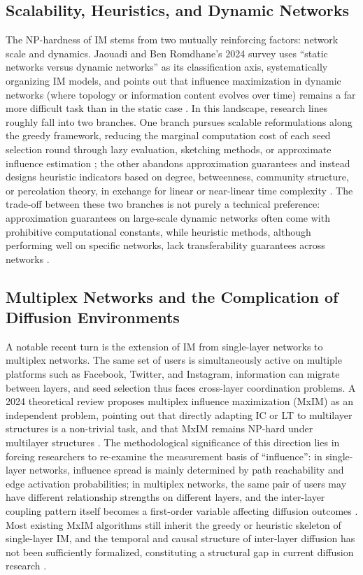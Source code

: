 \documentclass[12pt,a4paper]{article}
\begin{document}
\subsection{Scalability, Heuristics, and Dynamic Networks}

The NP-hardness of IM stems from two mutually reinforcing factors: network scale and dynamics. Jaouadi and Ben Romdhane's 2024 survey uses ``static networks versus dynamic networks'' as its classification axis, systematically organizing IM models, and points out that influence maximization in dynamic networks (where topology or information content evolves over time) remains a far more difficult task than in the static case \cite{ref7}. In this landscape, research lines roughly fall into two branches. One branch pursues scalable reformulations along the greedy framework, reducing the marginal computation cost of each seed selection round through lazy evaluation, sketching methods, or approximate influence estimation \cite{ref7}; the other abandons approximation guarantees and instead designs heuristic indicators based on degree, betweenness, community structure, or percolation theory, in exchange for linear or near-linear time complexity \cite{ref7}. The trade-off between these two branches is not purely a technical preference: approximation guarantees on large-scale dynamic networks often come with prohibitive computational constants, while heuristic methods, although performing well on specific networks, lack transferability guarantees across networks \cite{ref7}.

\subsection{Multiplex Networks and the Complication of Diffusion Environments}

A notable recent turn is the extension of IM from single-layer networks to multiplex networks. The same set of users is simultaneously active on multiple platforms such as Facebook, Twitter, and Instagram, information can migrate between layers, and seed selection thus faces cross-layer coordination problems. A 2024 theoretical review proposes multiplex influence maximization (MxIM) as an independent problem, pointing out that directly adapting IC or LT to multilayer structures is a non-trivial task, and that MxIM remains NP-hard under multilayer structures \cite{ref8}. The methodological significance of this direction lies in forcing researchers to re-examine the measurement basis of ``influence'': in single-layer networks, influence spread is mainly determined by path reachability and edge activation probabilities; in multiplex networks, the same pair of users may have different relationship strengths on different layers, and the inter-layer coupling pattern itself becomes a first-order variable affecting diffusion outcomes \cite{ref8}. Most existing MxIM algorithms still inherit the greedy or heuristic skeleton of single-layer IM, and the temporal and causal structure of inter-layer diffusion has not been sufficiently formalized, constituting a structural gap in current diffusion research \cite{ref8}.
\end{document}

